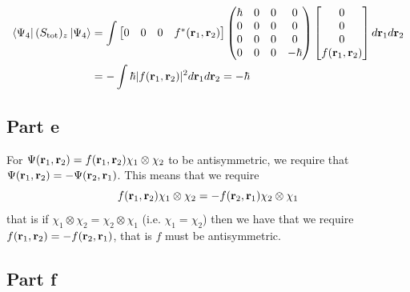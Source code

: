 \documentclass[12pt]{report}
\theoremstyle{custom}
\newcommand{\rb}{\bold{r}}
\begin{document}
  \begin{align*}
    \bra{\Psi_4}(S_{\text{tot}})_z \ket{\Psi_4} &= \int \begin{bmatrix} 0 & 0 & 0 & f^*(\rb_1,\rb_2) \end{bmatrix}  \begin{pmatrix} \hbar & 0 & 0 & 0 \\ 0 & 0 & 0 & 0 \\ 0 & 0 & 0 & 0 \\ 0 & 0 & 0 & -\hbar \end{pmatrix}  \begin{bmatrix} 0 \\ 0 \\ 0 \\ f(\rb_1,\rb_2) \end{bmatrix} d\rb_1 d\rb_2 \\
                                              &=  -\int \hbar |f(\rb_1,\rb_2)|^2 d\rb_1 d\rb_2 = -\hbar
  \end{align*}

\subsection*{Part e}
For $\Psi(\rb_1,\rb_2) = f(\rb_1,\rb_2) \chi_1 \otimes \chi_2$ to be antisymmetric, we require that $\Psi(\rb_1,\rb_2) = - \Psi(\rb_2,\rb_1)$. This means that we require
\begin{equation*}
f(\rb_1,\rb_2) \chi_1 \otimes \chi_2 = -f(\rb_2,\rb_1) \chi_2 \otimes \chi_1
\end{equation*}
that is if $\chi_1 \otimes \chi_2 = \chi_2 \otimes \chi_1$ (i.e. $\chi_1 = \chi_2$) then we have that we require $f(\rb_1, \rb_2) = -f(\rb_2,\rb_1)$, that is $f$ must be antisymmetric.  

\subsection*{Part f}
\end{document}
